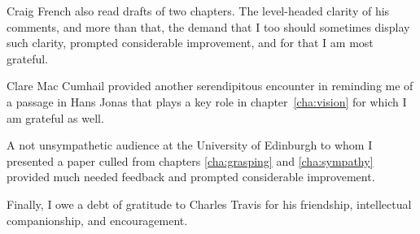 Craig French also read drafts of two chapters. The level-headed clarity of his comments, and more than that, the demand that I too should sometimes display such clarity, prompted considerable improvement, and for that I am most grateful.

Clare Mac Cumhail provided another serendipitous encounter in reminding me of a passage in Hans Jonas that plays a key role in chapter~\ref{cha:vision} for which I am grateful as well.

A not unsympathetic audience at the University of Edinburgh to whom I presented a paper culled from chapters \ref{cha:grasping} and \ref{cha:sympathy} provided much needed feedback and prompted considerable improvement.

Finally, I owe a debt of gratitude to Charles Travis for his friendship, intellectual companionship, and encouragement.


